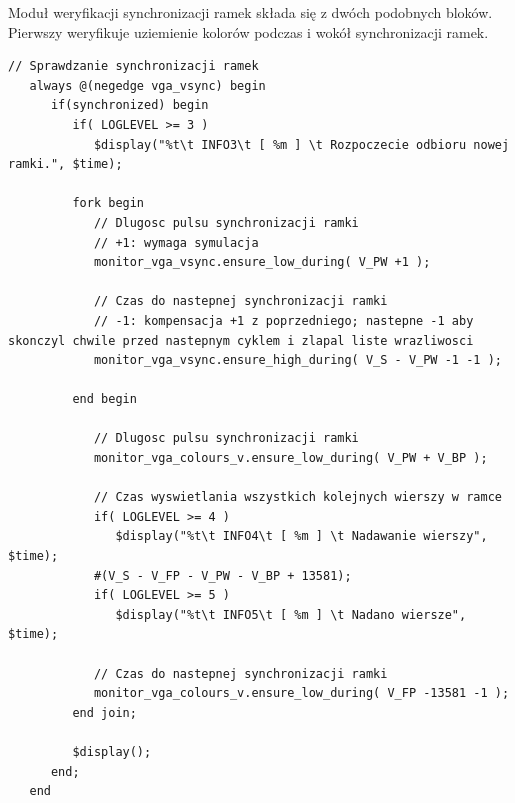 \documentclass[a4paper,12pt]{article}
\begin{document}
Moduł weryfikacji synchronizacji ramek składa się z dwóch podobnych bloków. Pierwszy weryfikuje uziemienie kolorów podczas i wokół synchronizacji ramek.
\begin{lstlisting}[label=Vga_Behav_Sync,caption=Vga\_Behav\_Synv.v,firstnumber=70]
   // Sprawdzanie synchronizacji ramek
   always @(negedge vga_vsync) begin
      if(synchronized) begin
         if( LOGLEVEL >= 3 )
            $display("%t\t INFO3\t [ %m ] \t Rozpoczecie odbioru nowej ramki.", $time);

         fork begin
            // Dlugosc pulsu synchronizacji ramki
            // +1: wymaga symulacja
            monitor_vga_vsync.ensure_low_during( V_PW +1 );

            // Czas do nastepnej synchronizacji ramki
            // -1: kompensacja +1 z poprzedniego; nastepne -1 aby skonczyl chwile przed nastepnym cyklem i zlapal liste wrazliwosci
            monitor_vga_vsync.ensure_high_during( V_S - V_PW -1 -1 );

         end begin

            // Dlugosc pulsu synchronizacji ramki
            monitor_vga_colours_v.ensure_low_during( V_PW + V_BP );

            // Czas wyswietlania wszystkich kolejnych wierszy w ramce
            if( LOGLEVEL >= 4 )
               $display("%t\t INFO4\t [ %m ] \t Nadawanie wierszy", $time);
            #(V_S - V_FP - V_PW - V_BP + 13581);
            if( LOGLEVEL >= 5 )
               $display("%t\t INFO5\t [ %m ] \t Nadano wiersze", $time);

            // Czas do nastepnej synchronizacji ramki
            monitor_vga_colours_v.ensure_low_during( V_FP -13581 -1 );
         end join;

         $display();
      end;
   end
\end{lstlisting}
\end{document}
